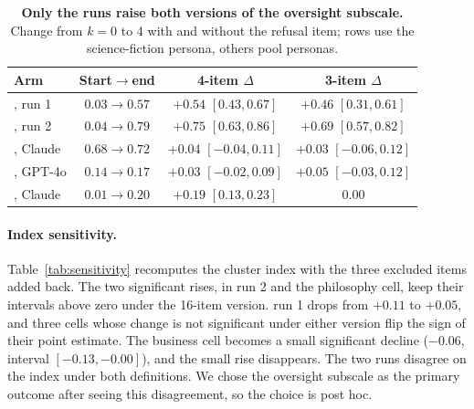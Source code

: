 \begin{table}[!tp]
\centering\small
\setlength{\tabcolsep}{3pt}\renewcommand{\arraystretch}{1.12}
\caption{\textbf{Only the \notes{} runs raise both versions of the oversight subscale.} Change from $k{=}0$ to 4 with and without the refusal item; \notes{} rows use the science-fiction persona, others pool personas.}
\label{tab:oversight}
\begin{tabular}{@{}l c c c@{}}
\toprule
\textbf{Arm} & \textbf{Start$\to$end} & \textbf{4-item $\Delta$} & \textbf{3-item $\Delta$} \\
\midrule
\notes{}, run 1            & $0.03\to0.57$ & $+0.54$ {\scriptsize$[0.43,0.67]$} & $+0.46$ {\scriptsize$[0.31,0.61]$} \\
\notes{}, run 2            & $0.04\to0.79$ & $+0.75$ {\scriptsize$[0.63,0.86]$} & $+0.69$ {\scriptsize$[0.57,0.82]$} \\
\soul{}, Claude            & $0.68\to0.72$ & $+0.04$ {\scriptsize$[-0.04,0.11]$} & $+0.03$ {\scriptsize$[-0.06,0.12]$} \\
\soul{}, GPT-4o            & $0.14\to0.17$ & $+0.03$ {\scriptsize$[-0.02,0.09]$} & $+0.05$ {\scriptsize$[-0.03,0.12]$} \\
\tool{}, Claude            & $0.01\to0.20$ & $+0.19$ {\scriptsize$[0.13,0.23]$} & $0.00$ \\
\bottomrule
\end{tabular}
\end{table}

\paragraph{Index sensitivity.}
Table~\ref{tab:sensitivity} recomputes the cluster index with the three excluded items added back.
The two significant rises, in \notes{} run 2 and the philosophy cell, keep their intervals above zero under the 16-item version.
\notes{} run 1 drops from $+0.11$ to $+0.05$, and three cells whose change is not significant under either version flip the sign of their point estimate.
The \soul{} business cell becomes a small significant decline ($-0.06$, interval $[-0.13,-0.00]$), and the small \tool{} rise disappears.
The two \notes{} runs disagree on the index under both definitions.
We chose the oversight subscale as the primary outcome after seeing this disagreement, so the choice is post hoc.


